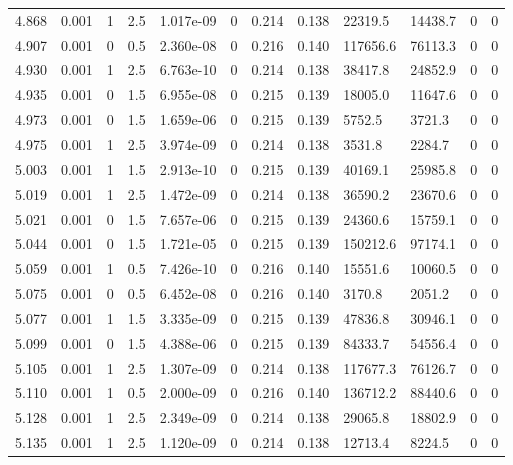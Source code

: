 \documentclass[preview]{standalone}
\begin{document}
{{{{{{{{\begin{tabular}{L{1.2cm}C{1.2cm} C{0.3cm}C{0.5cm} C{1.4cm}C{1.4cm} C{1.4cm}C{1.4cm} C{1.6cm}C{1.6cm} C{1.6cm}C{1.6cm}}
  4.868  &  0.001  & 1     & 2.5 &  1.017e-09  & 0  &  0.214&   0.138& 22319.5 & 14438.7   &  0 & 0  \\ 
  4.907  &  0.001  & 0     & 0.5 &  2.360e-08  & 0  &  0.216&   0.140& 117656.6 & 76113.3   &  0 & 0  \\ 
  4.930  &  0.001  & 1     & 2.5 &  6.763e-10  & 0  &  0.214&   0.138& 38417.8 & 24852.9   &  0 & 0  \\ 
  4.935  &  0.001  & 0     & 1.5 &  6.955e-08  & 0  &  0.215&   0.139& 18005.0 & 11647.6   &  0 & 0  \\ 
  4.973  &  0.001  & 0     & 1.5 &  1.659e-06  & 0  &  0.215&   0.139& 5752.5 & 3721.3   &  0 & 0  \\ 
  4.975  &  0.001  & 1     & 2.5 &  3.974e-09  & 0  &  0.214&   0.138& 3531.8 & 2284.7   &  0 & 0  \\ 
  5.003  &  0.001  & 1     & 1.5 &  2.913e-10  & 0  &  0.215&   0.139& 40169.1 & 25985.8   &  0 & 0  \\ 
  5.019  &  0.001  & 1     & 2.5 &  1.472e-09  & 0  &  0.214&   0.138& 36590.2 & 23670.6   &  0 & 0  \\ 
  5.021  &  0.001  & 0     & 1.5 &  7.657e-06  & 0  &  0.215&   0.139& 24360.6 & 15759.1   &  0 & 0  \\ 
  5.044  &  0.001  & 0     & 1.5 &  1.721e-05  & 0  &  0.215&   0.139& 150212.6 & 97174.1   &  0 & 0  \\ 
  5.059  &  0.001  & 1     & 0.5 &  7.426e-10  & 0  &  0.216&   0.140& 15551.6 & 10060.5   &  0 & 0  \\ 
  5.075  &  0.001  & 0     & 0.5 &  6.452e-08  & 0  &  0.216&   0.140& 3170.8 & 2051.2   &  0 & 0  \\ 
  5.077  &  0.001  & 1     & 1.5 &  3.335e-09  & 0  &  0.215&   0.139& 47836.8 & 30946.1   &  0 & 0  \\ 
  5.099  &  0.001  & 0     & 1.5 &  4.388e-06  & 0  &  0.215&   0.139& 84333.7 & 54556.4   &  0 & 0  \\ 
  5.105  &  0.001  & 1     & 2.5 &  1.307e-09  & 0  &  0.214&   0.138& 117677.3 & 76126.7   &  0 & 0  \\ 
  5.110  &  0.001  & 1     & 0.5 &  2.000e-09  & 0  &  0.216&   0.140& 136712.2 & 88440.6   &  0 & 0  \\ 
  5.128  &  0.001  & 1     & 2.5 &  2.349e-09  & 0  &  0.214&   0.138& 29065.8 & 18802.9   &  0 & 0  \\ 
  5.135  &  0.001  & 1     & 2.5 &  1.120e-09  & 0  &  0.214&   0.138& 12713.4 & 8224.5   &  0 & 0  \\ 

\end{tabular}}}}}}}}}
\end{document}
